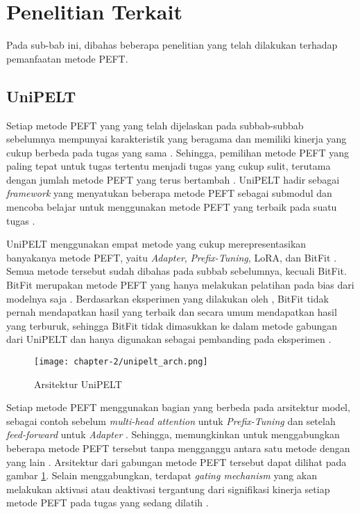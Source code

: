 \section{Penelitian Terkait}
Pada sub-bab ini, dibahas beberapa penelitian yang telah dilakukan terhadap pemanfaatan metode PEFT.

\subsection{UniPELT}

Setiap metode PEFT yang yang telah dijelaskan pada subbab-subbab sebelumnya mempunyai karakteristik yang beragama dan memiliki kinerja yang cukup berbeda pada tugas yang sama \parencite{unipelt}. Sehingga, pemilihan metode PEFT yang paling tepat untuk tugas tertentu menjadi tugas yang cukup sulit, terutama dengan jumlah metode PEFT yang terus bertambah \parencite{unipelt}. UniPELT hadir sebagai \textit{framework} yang menyatukan beberapa metode PEFT sebagai submodul dan mencoba belajar untuk menggunakan metode PEFT yang terbaik pada suatu tugas \parencite{unipelt}.

UniPELT menggunakan empat metode yang cukup merepresentasikan banyakanya metode PEFT, yaitu \textit{Adapter}, \textit{Prefix-Tuning}, LoRA, dan BitFit \parencite{unipelt}. Semua metode tersebut sudah dibahas pada subbab sebelumnya, kecuali BitFit. BitFit merupakan metode PEFT yang hanya melakukan pelatihan pada bias dari modelnya saja \parencite{unipelt}. Berdasarkan eksperimen yang dilakukan oleh \citeauthor{unipelt}, BitFit tidak pernah mendapatkan hasil yang terbaik dan secara umum mendapatkan hasil yang terburuk, sehingga BitFit tidak dimasukkan ke dalam metode gabungan dari UniPELT dan hanya digunakan sebagai pembanding pada eksperimen \parencite{unipelt}.

\begin{figure}[h]
    \vspace{0.25cm}
    \centering
    \texttt{[image: chapter-2/unipelt\_arch.png]}
    \caption{Arsitektur UniPELT \parencite{unipelt}}
    \label{fig:unipelt_arch}
\end{figure}

Setiap metode PEFT menggunakan bagian yang berbeda pada arsitektur model, sebagai contoh sebelum \textit{multi-head attention} untuk \textit{Prefix-Tuning} dan setelah \textit{feed-forward} untuk \textit{Adapter} \parencite{unipelt}. Sehingga, memungkinkan untuk menggabungkan beberapa metode PEFT tersebut tanpa mengganggu antara satu metode dengan yang lain \parencite{unipelt}. Arsitektur dari gabungan metode PEFT tersebut dapat dilihat pada gambar \ref{fig:unipelt_arch}. Selain menggabungkan, terdapat \textit{gating mechanism} yang akan melakukan aktivasi atau deaktivasi tergantung dari signifikasi kinerja setiap metode PEFT pada tugas yang sedang dilatih \parencite{unipelt}.

